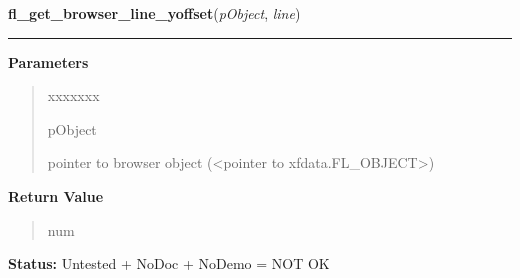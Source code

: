 \hspace{.8\funcindent}\begin{boxedminipage}{\funcwidth}

    \raggedright \textbf{fl\_get\_browser\_line\_yoffset}(\textit{pObject}, \textit{line})

    \vspace{-1.5ex}

    \rule{\textwidth}{0.5\fboxrule}
\setlength{\parskip}{2ex}
\setlength{\parskip}{1ex}
      \textbf{Parameters}
      \vspace{-1ex}

      \begin{quote}
        \begin{Ventry}{xxxxxxx}

          \item[pObject]

          pointer to browser object ({\textless}pointer to 
          xfdata.FL\_OBJECT{\textgreater})

        \end{Ventry}

      \end{quote}

      \textbf{Return Value}
    \vspace{-1ex}

      \begin{quote}
      num

      \end{quote}

\textbf{Status:} Untested + NoDoc + NoDemo = NOT OK



    \end{boxedminipage}

    \label{xformslib:library:fl_get_browser_hscroll_callback}

    \vspace{0.5ex}

